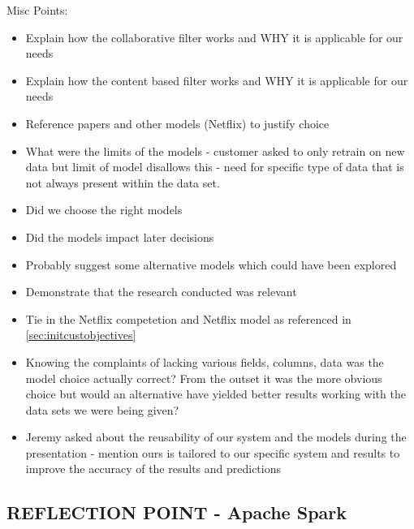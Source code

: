 \documentclass{l3proj}
\begin{document}
Misc Points:
\begin{itemize}
\item Explain how the collaborative filter works and WHY it is applicable for our needs
\item Explain how the content based filter works and WHY it is applicable for our needs
\item Reference papers and other models (Netflix) to justify choice
\item What were the limits of the models - customer asked to only retrain on new data but limit of model disallows this - need for specific type of data that is not always present within the data set.
\item Did we choose the right models
\item Did the models impact later decisions
\item Probably suggest some alternative models which could have been explored
\item Demonstrate that the research conducted was relevant
\item Tie in the Netflix competetion and Netflix model as referenced in \ref{sec:initcustobjectives}
\item Knowing the complaints of lacking various fields, columns, data was the model choice actually correct? From the outset it was the more obvious choice but would an alternative have yielded better results working with the data sets we were being given?
\item Jeremy asked about the reusability of our system and the models during the presentation - mention ours is tailored to our specific system and results to improve the accuracy of the results and predictions
\end{itemize}


\subsection{REFLECTION POINT - Apache Spark}
\label{sec:sparkreflection}
\end{document}
